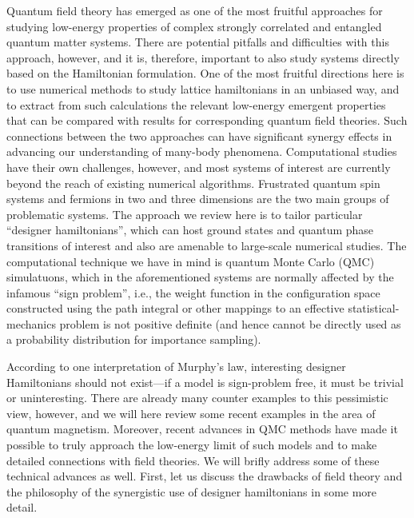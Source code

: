 \documentclass[aps,prb,groupedaddress,twocolumn]{revtex4}
\begin{document}
Quantum field theory has emerged as one of the most fruitful approaches for studying low-energy properties of
complex strongly correlated and entangled quantum matter systems. There are potential pitfalls and difficulties 
with this approach, however, and it is, therefore, important to also study systems directly based on the Hamiltonian 
formulation. One of the most fruitful directions here is to use numerical methods to study lattice hamiltonians 
in an unbiased way, and to extract from such calculations the relevant low-energy emergent properties that can 
be compared with results for corresponding quantum field theories. Such connections between the two approaches 
can have significant synergy effects in advancing our understanding of many-body phenomena. Computational studies 
have their own challenges, however, and most systems of interest are currently 
beyond the reach of existing numerical algorithms. Frustrated quantum spin systems and fermions in two and three 
dimensions are the two main groups of problematic systems. The approach we review here is to tailor particular 
``designer hamiltonians'', which can host ground states and quantum phase transitions of interest and also are 
amenable to large-scale numerical studies. The computational technique we have in mind is quantum Monte Carlo 
(QMC) simulatuons, which in the aforementioned systems are normally affected by the infamous ``sign problem'', 
i.e., the weight function in the configuration space constructed using the path integral or other mappings to 
an effective statistical-mechanics problem is not positive definite (and hence cannot be directly used as 
a probability distribution for importance sampling).

According to one interpretation of Murphy's law, interesting designer Hamiltonians should not exist---if a 
model is sign-problem free, it must be trivial or uninteresting. There are already many counter examples to this
pessimistic view, however, and we will here review some recent examples in the area of quantum magnetism. 
Moreover, recent advances in QMC methods have made it possible to truly approach the low-energy limit of
such models and to make detailed connections with field theories. We will brifly address some of these technical 
advances as well. First, let us discuss the drawbacks of field theory and the philosophy of the synergistic
use of designer hamiltonians  in some more detail.
\end{document}
